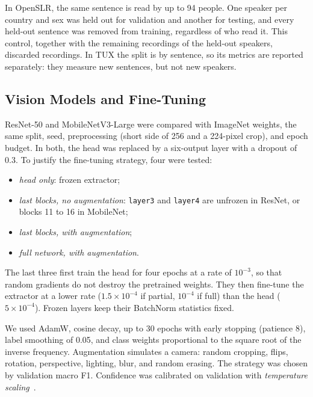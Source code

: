 In OpenSLR, the same sentence is read by up to 94 people. One speaker per country and sex was held out for validation and another for testing, and every held-out sentence was removed from training, regardless of who read it. This control, together with the remaining recordings of the held-out speakers, discarded \AudioLeak{} recordings. In TUX the split is by sentence, so its metrics are reported separately: they measure new sentences, but not new speakers.

\begin{table}[t]
\centering
\caption{Recordings per split}
\label{tab:audio}

\end{table}

\subsection{Vision Models and Fine-Tuning}
ResNet-50 and MobileNetV3-Large were compared with ImageNet weights, the same split, seed, preprocessing (short side of 256 and a 224-pixel crop), and epoch budget. In both, the head was replaced by a six-output layer with a dropout of 0.3. To justify the fine-tuning strategy, four were tested:
\begin{itemize}
\item \emph{head only}: frozen extractor;
\item \emph{last blocks, no augmentation}: \texttt{layer3} and \texttt{layer4} are unfrozen in ResNet, or blocks 11 to 16 in MobileNet;
\item \emph{last blocks, with augmentation};
\item \emph{full network, with augmentation}.
\end{itemize}
The last three first train the head for four epochs at a rate of $10^{-3}$, so that random gradients do not destroy the pretrained weights. They then fine-tune the extractor at a lower rate ($1.5\times10^{-4}$ if partial, $10^{-4}$ if full) than the head ($5\times10^{-4}$). Frozen layers keep their BatchNorm statistics fixed.

We used AdamW, cosine decay, up to 30 epochs with early stopping (patience 8), label smoothing of 0.05, and class weights proportional to the square root of the inverse frequency. Augmentation simulates a camera: random cropping, flips, rotation, perspective, lighting, blur, and random erasing. The strategy was chosen by validation macro F1. Confidence was calibrated on validation with \emph{temperature scaling}~\cite{calibration}.

